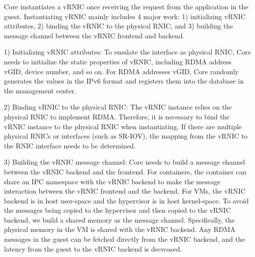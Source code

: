 
\sys Core instantiates a vRNIC  once receiving the request from the application in the guest. Instantiating vRNIC mainly includes 4 major work: 1) initializing vRNIC attributes, 2) binding the vRNIC to the physical RNIC, and 3) building the message channel between the vRNIC frontend and backend.


1) Initializing vRNIC attributes: To emulate the interface as physical RNIC, \sys Core needs to initialize the static properties of vRNIC, including RDMA address vGID, device number, and so on. For RDMA addresses vGID, \sys Core randomly generates the values in the IPv6 format and registers them into the database in the management center.


2) Binding vRNIC to the physical RNIC: The vRNIC instance relies on the physical RNIC to implement RDMA. Therefore, it is necessary to bind the vRNIC instance to the physical RNIC when instantiating. If there are multiple physical RNICs or interfaces (such as SR-IOV), the mapping from the vRNIC to the RNIC interface needs to be determined.


3) Building the vRNIC message channel: \sys Core needs to build a message channel between the vRNIC backend and the frontend. For containers, the container can share an IPC namespace with the vRNIC backend to make the message interaction between the vRNIC frontend and the backend. For VMs, the vRNIC backend is in host user-space and the hypervisor is in host kernel-space. To avoid the messages being copied to the hypervisor and then copied to the vRNIC backend, we build a shared memory as the message channel. Specifically, the physical memory in the VM is shared with the vRNIC backend. Any RDMA messages in the guest can be fetched directly from the vRNIC backend, and the latency from the guest to the vRNIC backend is decreased.

